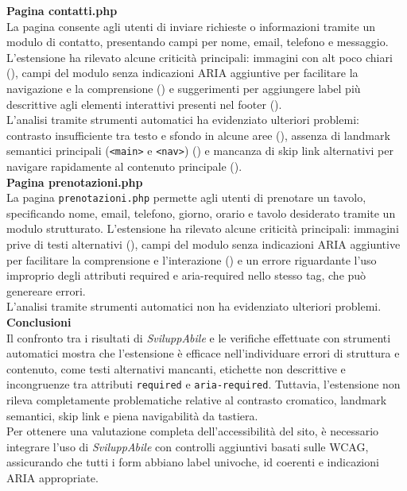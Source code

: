 \noindent \textbf{Pagina contatti.php}\\
La pagina consente agli utenti di inviare richieste o informazioni tramite un modulo di contatto, presentando campi per nome, email, telefono e messaggio. L’estensione ha rilevato alcune criticità principali: immagini con alt poco chiari ({}), campi del modulo senza indicazioni ARIA aggiuntive per facilitare la navigazione e la comprensione ({}) e suggerimenti per aggiungere label più descrittive agli elementi interattivi presenti nel footer ({}).\\
L’analisi tramite strumenti automatici ha evidenziato ulteriori problemi: contrasto insufficiente tra testo e sfondo in alcune aree ({}), assenza di landmark semantici principali (\texttt{<main>} e \texttt{<nav>}) ({}) e mancanza di skip link alternativi per navigare rapidamente al contenuto principale ({}).\\

\noindent \textbf{Pagina prenotazioni.php}\\
La pagina \texttt{prenotazioni.php} permette agli utenti di prenotare un tavolo, specificando nome, email, telefono, giorno, orario e tavolo desiderato tramite un modulo strutturato. L’estensione ha rilevato alcune criticità principali: immagini prive di testi alternativi ({}), campi del modulo senza indicazioni ARIA aggiuntive per facilitare la comprensione e l’interazione ({}) e un errore riguardante l'uso improprio degli attributi required e aria-required nello stesso tag, che può genereare errori.\\
L’analisi tramite strumenti automatici non ha evidenziato ulteriori problemi.\\

\noindent \textbf{Conclusioni}\\
Il confronto tra i risultati di \textit{SviluppAbile} e le verifiche effettuate con strumenti automatici mostra che l’estensione è efficace nell’individuare errori di struttura e contenuto, come testi alternativi mancanti, etichette non descrittive e incongruenze tra attributi \texttt{required} e \texttt{aria-required}. Tuttavia, l’estensione non rileva completamente problematiche relative al contrasto cromatico, landmark semantici, skip link e piena navigabilità da tastiera.\\
Per ottenere una valutazione completa dell’accessibilità del sito, è necessario integrare l’uso di \textit{SviluppAbile} con controlli aggiuntivi basati sulle WCAG, assicurando che tutti i form abbiano label univoche, id coerenti e indicazioni ARIA appropriate.


